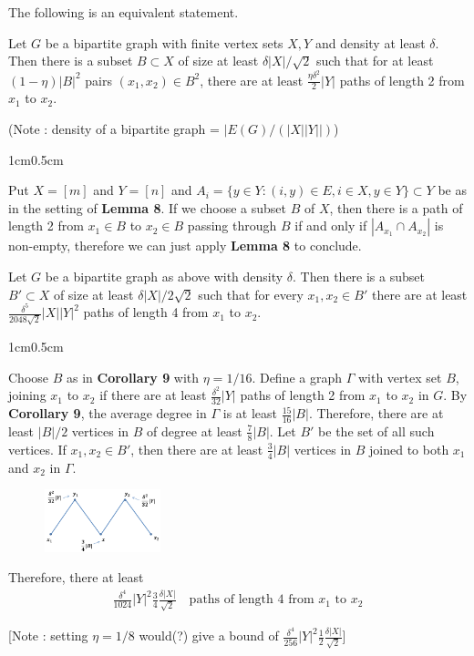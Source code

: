 \documentclass[10pt,a4paper]{report}
\newenvironment{proof}
{\begin{changemargin}{1cm}{0.5cm}
	}%
	{\end{changemargin}
}
\begin{document}
The following is an equivalent statement.
\s

 Let $G$ be a bipartite graph with finite vertex sets $X,Y$ and density at least $\delta$. Then there is a subset $B\subset X$ of size at least $\delta |X| /\sqrt{2}$ such that for at least $(1-\eta)|B|^2$ pairs $(x_1,x_2)\in B^2$, there are at least $\frac{\eta \delta^2}{2} |Y|$ paths of length 2 from $x_1$ to $x_2$. 

(Note : density of a bipartite graph = $|E(G)/(|X||Y||)$)
\begin{proof}
\pf Put $X =[m]$ and $Y= [n]$ and $A_i = \{y\in Y : (i,y) \in E, i\in X, y\in Y \} \subset Y $ be as in the setting of \textbf{Lemma 8}. If we choose a subset $B$ of $X$, then there is a path of length 2 from $x_1 \in B$ to $x_2 \in B$ passing through $B$ if and only if $|A_{x_1}\cap A_{x_2}|$ is non-empty, therefore we can just apply \textbf{Lemma 8} to conclude.

\eop
\end{proof}

\s

 Let $G$ be a bipartite graph as above with density $\delta$. Then there is a subset $B'\subset X$ of size at least $\delta |X|/2\sqrt{2}$ such that for every $x_1, x_2 \in B'$ there are at least $\frac{\delta^5}{2048 \sqrt{2}} |X| |Y|^2$ paths of length 4 from $x_1$ to $x_2$. 
\begin{proof}
\pf Choose $B$ as in \textbf{Corollary 9} with $\eta = 1/16$. Define a graph $\Gamma$ with vertex set $B$, joining $x_1$ to $x_2$ if there are at least $\frac{\delta^2}{32}|Y|$ paths of length 2 from $x_1$ to $x_2$ in $G$. By \textbf{Corollary 9}, the average degree in $\Gamma$ is at least $\frac{15}{16}|B|$. Therefore, there are at least $|B|/2$ vertices in $B$ of degree at least $\frac{7}{8}|B|$. Let $B'$ be the set of all such vertices. If $x_1,x_2\in B'$, then there are at least $\frac{3}{4} |B|$ vertices in $B$ joined to both $x_1$ and $x_2$ in $\Gamma$.
\begin{figure}[h]
	\centering
	\includegraphics[width=0.3\textwidth]{1}
\end{figure}
Therefore, there at least
\begin{align*}
\frac{\delta^4}{1024} |Y|^2 \frac{3}{4} \frac{\delta |X|}{\sqrt{2}} \quad \text{paths of length 4 from } x_1 \text{ to } x_2
\end{align*} 



[Note : setting $\eta= 1/8$ would(?) give a bound of $\frac{\delta^4}{256} |Y|^2 \frac{1}{2} \frac{\delta |X|}{\sqrt{2}}$]

\eop
\end{proof}
\s
\end{document}
